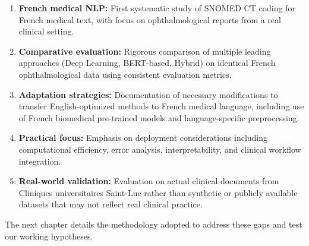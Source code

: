 \begin{enumerate}
    \item \textbf{French medical NLP:} First systematic study of SNOMED CT coding for French medical text, with focus on ophthalmological reports from a real clinical setting.

    \item \textbf{Comparative evaluation:} Rigorous comparison of multiple leading approaches (Deep Learning, BERT-based, Hybrid) on identical French ophthalmological data using consistent evaluation metrics.

    \item \textbf{Adaptation strategies:} Documentation of necessary modifications to transfer English-optimized methods to French medical language, including use of French biomedical pre-trained models and language-specific preprocessing.

    \item \textbf{Practical focus:} Emphasis on deployment considerations including computational efficiency, error analysis, interpretability, and clinical workflow integration.

    \item \textbf{Real-world validation:} Evaluation on actual clinical documents from Cliniques universitaires Saint-Luc rather than synthetic or publicly available datasets that may not reflect real clinical practice.
\end{enumerate}

The next chapter details the methodology adopted to address these gaps and test our working hypotheses.
